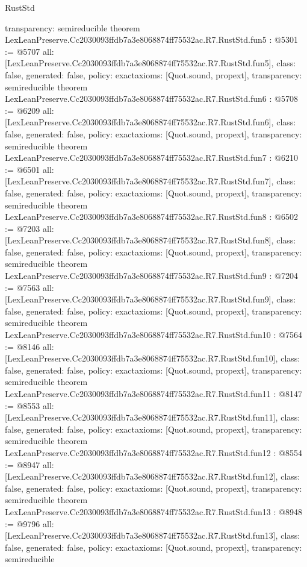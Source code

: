 \begin{lexlean}{RustStd}
\begin{coremodule}
{  transparency: semireducible
}
theorem LexLeanPreserve.Cc2030093ffdb7a3e8068874ff75532ac.R7.RustStd.fun5 : @5301 := @5707 {
  all: [LexLeanPreserve.Cc2030093ffdb7a3e8068874ff75532ac.R7.RustStd.fun5],
  class: false,
  generated: false,
  policy: exact{axioms: [Quot.sound, propext]},
  transparency: semireducible
}
theorem LexLeanPreserve.Cc2030093ffdb7a3e8068874ff75532ac.R7.RustStd.fun6 : @5708 := @6209 {
  all: [LexLeanPreserve.Cc2030093ffdb7a3e8068874ff75532ac.R7.RustStd.fun6],
  class: false,
  generated: false,
  policy: exact{axioms: [Quot.sound, propext]},
  transparency: semireducible
}
theorem LexLeanPreserve.Cc2030093ffdb7a3e8068874ff75532ac.R7.RustStd.fun7 : @6210 := @6501 {
  all: [LexLeanPreserve.Cc2030093ffdb7a3e8068874ff75532ac.R7.RustStd.fun7],
  class: false,
  generated: false,
  policy: exact{axioms: [Quot.sound, propext]},
  transparency: semireducible
}
theorem LexLeanPreserve.Cc2030093ffdb7a3e8068874ff75532ac.R7.RustStd.fun8 : @6502 := @7203 {
  all: [LexLeanPreserve.Cc2030093ffdb7a3e8068874ff75532ac.R7.RustStd.fun8],
  class: false,
  generated: false,
  policy: exact{axioms: [Quot.sound, propext]},
  transparency: semireducible
}
theorem LexLeanPreserve.Cc2030093ffdb7a3e8068874ff75532ac.R7.RustStd.fun9 : @7204 := @7563 {
  all: [LexLeanPreserve.Cc2030093ffdb7a3e8068874ff75532ac.R7.RustStd.fun9],
  class: false,
  generated: false,
  policy: exact{axioms: [Quot.sound, propext]},
  transparency: semireducible
}
theorem LexLeanPreserve.Cc2030093ffdb7a3e8068874ff75532ac.R7.RustStd.fun10 : @7564 := @8146 {
  all: [LexLeanPreserve.Cc2030093ffdb7a3e8068874ff75532ac.R7.RustStd.fun10],
  class: false,
  generated: false,
  policy: exact{axioms: [Quot.sound, propext]},
  transparency: semireducible
}
theorem LexLeanPreserve.Cc2030093ffdb7a3e8068874ff75532ac.R7.RustStd.fun11 : @8147 := @8553 {
  all: [LexLeanPreserve.Cc2030093ffdb7a3e8068874ff75532ac.R7.RustStd.fun11],
  class: false,
  generated: false,
  policy: exact{axioms: [Quot.sound, propext]},
  transparency: semireducible
}
theorem LexLeanPreserve.Cc2030093ffdb7a3e8068874ff75532ac.R7.RustStd.fun12 : @8554 := @8947 {
  all: [LexLeanPreserve.Cc2030093ffdb7a3e8068874ff75532ac.R7.RustStd.fun12],
  class: false,
  generated: false,
  policy: exact{axioms: [Quot.sound, propext]},
  transparency: semireducible
}
theorem LexLeanPreserve.Cc2030093ffdb7a3e8068874ff75532ac.R7.RustStd.fun13 : @8948 := @9796 {
  all: [LexLeanPreserve.Cc2030093ffdb7a3e8068874ff75532ac.R7.RustStd.fun13],
  class: false,
  generated: false,
  policy: exact{axioms: [Quot.sound, propext]},
  transparency: semireducible
}
\end{coremodule}
\end{lexlean}
